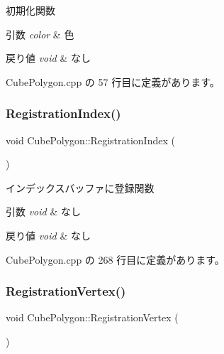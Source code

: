 初期化関数 


\begin{DoxyParams}{引数}
{\em color} & 色 \\
\hline
\end{DoxyParams}

\begin{DoxyRetVals}{戻り値}
{\em void} & なし \\
\hline
\end{DoxyRetVals}


 Cube\+Polygon.\+cpp の 57 行目に定義があります。

\mbox{\label{class_cube_polygon_a5a935712a3e3c1e12552aeedf2f409c1}} 
\subsubsection{\texorpdfstring{Registration\+Index()}{RegistrationIndex()}}
{\footnotesize\ttfamily void Cube\+Polygon\+::\+Registration\+Index (\begin{DoxyParamCaption}{ }\end{DoxyParamCaption})\hspace{0.3cm}{\ttfamily [private]}}



インデックスバッファに登録関数 


\begin{DoxyParams}{引数}
{\em void} & なし \\
\hline
\end{DoxyParams}

\begin{DoxyRetVals}{戻り値}
{\em void} & なし \\
\hline
\end{DoxyRetVals}


 Cube\+Polygon.\+cpp の 268 行目に定義があります。

\mbox{\label{class_cube_polygon_adde345ed591e3e81abcffdcac5068f98}} 
\subsubsection{\texorpdfstring{Registration\+Vertex()}{RegistrationVertex()}}
{\footnotesize\ttfamily void Cube\+Polygon\+::\+Registration\+Vertex (\begin{DoxyParamCaption}{ }\end{DoxyParamCaption})\hspace{0.3cm}{\ttfamily [private]}}



